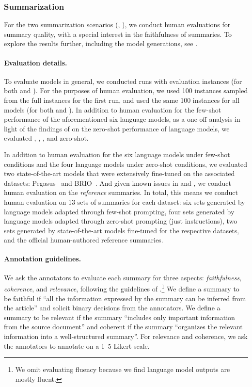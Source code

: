 \subsubsection{Summarization}
\label{sec:human-evaluation-summarization}
For the two summarization scenarios (\cnndm, \xsum), we conduct human evaluations for summary quality, with a special interest in the faithfulness of summaries.
To explore the results further, including the model generations, see  .

\paragraph{Evaluation details.}
To evaluate models in general, we conducted \numruns runs with \numevalinstances evaluation instances (for both \cnndm and \xsum).
For the purposes of human evaluation, we used 100 instances sampled from the full \numevalinstances instances for the first run, and used the same 100 instances for all models (for both \cnndm and \xsum).
In addition to human evaluation for the few-shot performance of the aforementioned six language models, as a one-off analysis in light of the findings of \citet{goyal2022news} on the zero-shot performance of language models, we evaluated \gptdavinci, \gptcurie, \instructdavinci, and \instructdavinci zero-shot.

In addition to human evaluation for the six language models under few-shot conditions and the four language models under zero-shot conditions, we evaluated two state-of-the-art models that were extensively fine-tuned on the associated datasets: Pegasus~\citep{zhang2020pegasus} and BRIO~\citep{liu-etal-2022-brio}.
And given  known issues in \cnndm and \xsum \citep[][]{bommasani2020intrinsic, gehrmann2022repairing, reiter2022summarization}, we conduct human evaluation on the \textit{reference} summaries.
In total, this means we conduct human evaluation on 13 sets of summaries for each dataset: six sets generated by language models adapted through few-shot prompting, four sets generated by language models adapted through zero-shot prompting (just instructions), two sets generated by state-of-the-art models fine-tuned for the respective datasets, and the official human-authored reference summaries. 

\paragraph{Annotation guidelines.}
We ask the annotators to evaluate each summary for three aspects: \textit{faithfulness}, \textit{coherence}, and \textit{relevance}, following the guidelines of \citet{fabbri-etal-2021-summeval}.\footnote{We omit evaluating fluency because we find language model outputs are mostly fluent.}
We define a summary to be faithful if ``all the information expressed by the summary can be inferred from the article'' and solicit binary decisions from the annotators.
We define a summary to be relevant if the summary ``includes only important information from the source document'' and coherent if the summary ``organizes the relevant information into a well-structured summary''.
For relevance and coherence, we ask the annotators to annotate on a 1--5 Likert scale.

